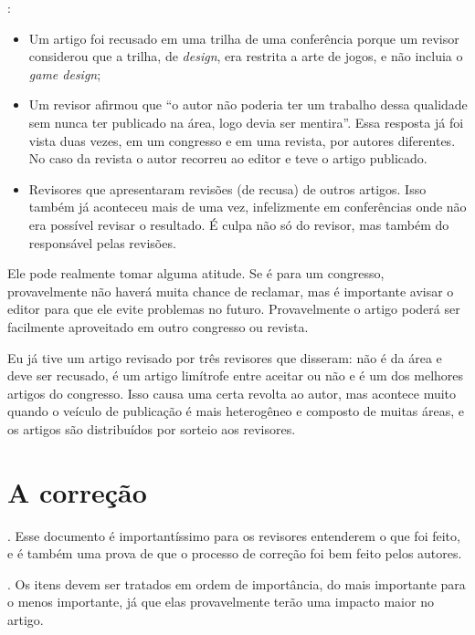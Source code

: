 \documentclass[openany]{book}
\begin{document}
:
\begin{itemize}
    \item Um artigo foi recusado em uma trilha de uma conferência porque um revisor considerou que a trilha, de \textit{design}, era restrita a arte de jogos, e não incluia o \textit{game design};
    \item Um revisor afirmou que ``o autor não poderia ter um trabalho dessa qualidade sem nunca ter publicado na área, logo devia ser mentira''.  Essa resposta já foi vista duas vezes, em um congresso e em uma revista, por autores diferentes. No caso da revista o autor recorreu ao editor e teve o artigo publicado.
    \item Revisores que apresentaram revisões (de recusa) de outros artigos. Isso também já aconteceu mais de uma vez, infelizmente em conferências onde não era possível revisar o resultado. É culpa não só do revisor, mas também do responsável pelas revisões.
\end{itemize}

 Ele pode realmente tomar alguma atitude. Se é para um congresso, provavelmente não haverá muita chance de reclamar, mas é importante avisar o editor para que ele evite problemas no futuro. Provavelmente o artigo poderá ser facilmente aproveitado em outro congresso ou revista.

 Eu já tive um artigo revisado por três revisores que disseram: não é da área e deve ser recusado, é um artigo limítrofe entre aceitar ou não e é um dos melhores artigos do congresso. Isso causa uma certa revolta ao autor, mas acontece muito quando o veículo de publicação é mais heterogêneo e composto de muitas áreas, e os artigos são distribuídos por sorteio aos revisores.

\section{A correção}

. Esse documento é importantíssimo para os revisores entenderem o que foi feito, e é também uma prova de que o processo de correção foi bem feito pelos autores.

. Os itens devem ser tratados em ordem de importância, do mais importante para o menos importante, já que elas provavelmente terão uma impacto maior no artigo.
\end{document}
